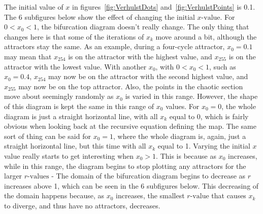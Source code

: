 \documentclass[a4wide, 10pt]{article}
\begin{document}
The initial value of $x$ in figures~\ref{fig:VerhulstDots} and~\ref{fig:VerhulstPoints} is 0.1. The 6 subfigures below show the effect of changing the initial $x \textrm{-value}$. For $ 0 < x_{0} < 1 $, the
 bifurcation diagram doesn't really change. The only thing that changes here is that
  some of the iterations of $x_{k}$ move around a bit, although the attractors stay
   the same. As an example, during a four-cycle attractor, $x_{0} = 0.1$ may mean
    that $x_{254}$ is on the attractor with the highest value, and $x_{255}$ is on
     the attractor with the lowest value. With another $x_{0}$, with 
      $0 < x_{0} < 1$, such as $x_{0} = 0.4$, $x_{254}$ may now be on the attractor
       with the second highest value, and $x_{255}$ may now be on the top attractor.
        Also, the points in the chaotic section move about seemingly randomly as
         $x_{0}$ is varied in this range. However, the shape of this diagram is kept the  same in this range of $x_{0}$ values. 
     For $x_{0} = 0$, the whole diagram is just a straight horizontal line, with all
 $x_{k}$ equal to 0, which is fairly obvious when looking back at the recursive equation
  defining the map. The same sort of thing can be said for $x_{0} = 1$, where the
   whole diagram is, again, just a straight horizontal line, but this time with all
    $x_{k}$ equal to 1. 
   Varying the initial $x$ value really starts to get interesting when $x_{0} > 1$.
 This is because as $x_{0}$ increases, while in this range, the diagram begins to stop
  plotting any attractors for the larger $r \textrm{-values}$ - The domain of the
   bifurcation diagram begins to decrease as $r$ increases above 1, which can be seen in the 6
    subfigures below. This decreasing of the domain happens because, as $x_{0}$
     increases, the smallest $r \textrm{-value}$ that causes $x_{k}$ to 
      diverge, and thus have no attractors, decreases. 
\end{document}
